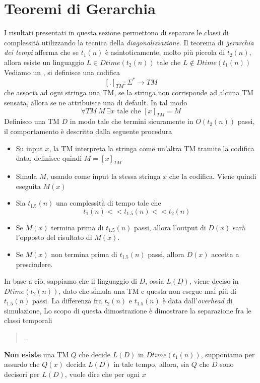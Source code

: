 \documentclass[10pt, letterpaper]{report}
\begin{document}
\section{Teoremi di Gerarchia}
I risultati presentati in questa sezione permettono di separare le classi di complessità utilizzando la tecnica della \textit{diagonalizzazione}.\acc {}
Il teorema di \textit{gerarchia dei tempi} afferma che se $t_1(n)$ è asintoticamente, molto più piccola di $t_2(n)$, allora esiste un linguaggio $L\in Dtime(t_2(n))$ tale che 
$L\notin Dtime(t_1(n))$\acc \dimo{}
Vediamo un , si definisce una codifica $$[.]_{TM}:\Sigma^*\rightarrow TM $$
che associa ad ogni stringa una TM, se la stringa non corrisponde ad alcuna TM sensata, allora se ne attribuisce una di default. In tal modo 
$$ \forall TM \ M  \ \exists x \text{ tale che }[x]_{TM}=M$$
Definisco una TM $D$ in modo tale che termini sicuramente in $O(t_2(n))$ passi, il comportamento è descritto dalla seguente procedura \begin{itemize}
    \item Su input $x$, la TM interpreta la stringa come un'altra TM tramite la codifica data, definisce quindi $M=[x]_{TM}$
    \item Simula $M$, usando come input la stessa stringa $x$ che la codifica. Viene quindi eseguita $M(x)$
    \item Sia $t_{1.5}(n)$ una complessità di tempo tale che 
     $$t_1(n)<<t_{1.5}(n)<<t_2(n) $$
     \item Se $M(x)$ termina prima di $t_{1.5}(n)$ passi, allora l'output di $D(x)$ sarà l'opposto del risultato di $M(x)$. 
     \item Se $M(x)$ non termina prima di $t_{1.5}(n)$ passi, allora 
     $D(x)$ accetta a prescindere.
\end{itemize}
In base a ciò, sappiamo che il linguaggio di $D$, ossia $L(D)$, viene deciso in $Dtime(t_2(n))$, dato che simula una TM e questa non esegue mai più di $t_{1.5}(n)$ passi. La differenza fra $t_2(n)$ e $t_{1.5}(n)$ è data dall'\textit{overhead} di simulazione,\acc 
Lo scopo di questa dimostrazione è dimostrare la separazione fra le classi temporali\begin{quote}
 .\end{quote}
\textbf{Non esiste} una TM $Q$ che decide $L(D)$ in $Dtime(t_1(n))$, supponiamo per assurdo che $Q(x)$ decida $L(D)$ in tale tempo, allora, sia $Q$ che $D$ sono decisori per $L(D)$, vuole dire che per ogni $x$
\end{document}
